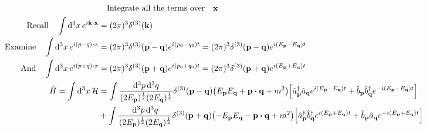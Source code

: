 \documentclass{article}
\begin{document}
\begin{align*}
                                                   & \qq{Integrate all the terms over}\vb{x}                                                                                                                                                                                                                                                                                 \\
  \qq*{Recall}\int \dd[3]{x}e^{i\vb{k}\vdot\vb{x}} & =(2\pi)^3 \delta^{(3)}(\vb{k})                                                                                                                                                                                                                                                                                          \\
  \qq*{Examine}\int \dd[3]{x}e^{i(p-q)\vdot x}     & =(2\pi)^3 \delta^{(3)}(\vb{p}-\vb{q})e^{i(p_0-q_0)t}=(2\pi)^3  \delta^{(3)}(\vb{p}-\vb{q})e^{i(E_{\vb{p}}-E_{\vb{q}})t}                                                                                                                                                                                                 \\
  \qq*{And}\int \dd[3]{x}e^{i(p+q)\vdot x}         & =(2\pi)^3 \delta^{(3)}(\vb{p}+\vb{q})e^{i(p_0+q_0)t}=(2\pi)^3  \delta^{(3)}(\vb{p}+\vb{q})e^{i(E_{\vb{p}}+E_{\vb{q}})t}                                                                                                                                                                                                 \\
  \hat{H}=\int\dd[3]{x}\mathcal{H}                 & =\int \frac{\dd[3]{p}\dd[3]{q}}{(2E_{\vb{p}})^{\frac{1}{2}}(2E_{\vb{q}})^{\frac{1}{2}}}\delta^{(3)}(\vb{p}-\vb{q})\pqty{E_{\vb{p}}E_{\vb{q}}+\vb{p}\vdot\vb{q}+m^2}\bqty{\hat{a}^\dagger_{\vb{p}}\hat{a}_{\vb{q}}e^{i(E_{\vb{p}}-E_{\vb{q}})t}+\hat{b}_{\vb{p}}\hat{b}^\dagger_{\vb{q}}e^{-i(E_{\vb{p}}-E_{\vb{q}})t}}  \\
                                                   & +\int \frac{\dd[3]{p}\dd[3]{q}}{(2E_{\vb{p}})^{\frac{1}{2}}(2E_{\vb{q}})^{\frac{1}{2}}}\delta^{(3)}(\vb{p}+\vb{q})\pqty{-E_{\vb{p}}E_{\vb{q}}-\vb{p}\vdot\vb{q}+m^2}\bqty{\hat{a}^\dagger_{\vb{p}}\hat{b}^\dagger_{\vb{q}}e^{i(E_{\vb{p}}+E_{\vb{q}})t}+\hat{b}_{\vb{p}}\hat{a}_{\vb{q}}e^{-i(E_{\vb{p}}+E_{\vb{q}})t}} \\
\end{align*}
\end{document}
